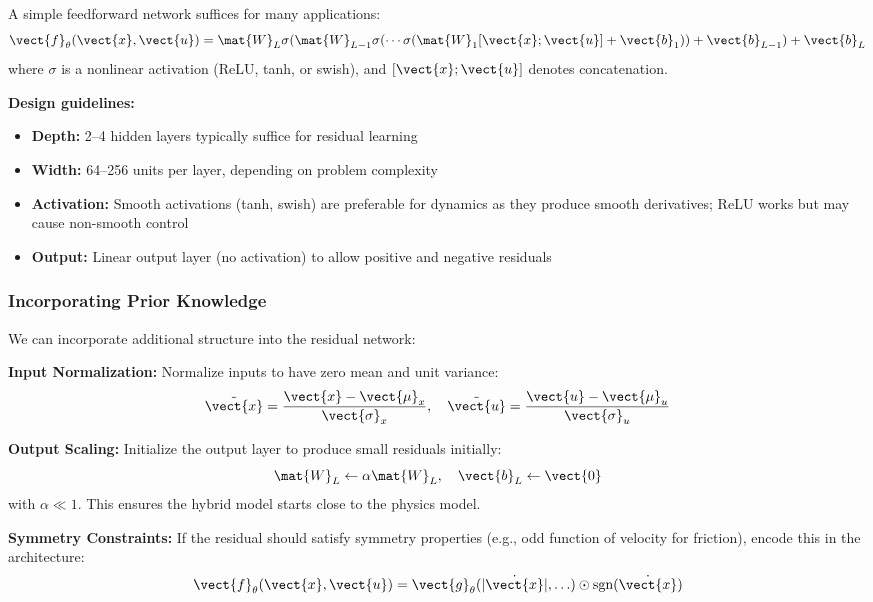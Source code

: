 A simple feedforward network suffices for many applications:
\begin{equation}
\vect{f}_\theta(\vect{x}, \vect{u}) = \mat{W}_L \sigma(\mat{W}_{L-1} \sigma(\cdots \sigma(\mat{W}_1 [\vect{x}; \vect{u}] + \vect{b}_1)) + \vect{b}_{L-1}) + \vect{b}_L
\label{eq:mlp_residual}
\end{equation}
where $\sigma$ is a nonlinear activation (ReLU, tanh, or swish), and $[\vect{x}; \vect{u}]$ denotes concatenation.

\textbf{Design guidelines:}
\begin{itemize}
    \item \textbf{Depth:} 2--4 hidden layers typically suffice for residual learning
    \item \textbf{Width:} 64--256 units per layer, depending on problem complexity
    \item \textbf{Activation:} Smooth activations (tanh, swish) are preferable for dynamics as they produce smooth derivatives; ReLU works but may cause non-smooth control
    \item \textbf{Output:} Linear output layer (no activation) to allow positive and negative residuals
\end{itemize}

\subsubsection{Incorporating Prior Knowledge}

We can incorporate additional structure into the residual network:

\textbf{Input Normalization:}
Normalize inputs to have zero mean and unit variance:
\begin{equation}
\tilde{\vect{x}} = \frac{\vect{x} - \vect{\mu}_x}{\vect{\sigma}_x}, \quad \tilde{\vect{u}} = \frac{\vect{u} - \vect{\mu}_u}{\vect{\sigma}_u}
\end{equation}

\textbf{Output Scaling:}
Initialize the output layer to produce small residuals initially:
\begin{equation}
\mat{W}_L \leftarrow \alpha \mat{W}_L, \quad \vect{b}_L \leftarrow \vect{0}
\end{equation}
with $\alpha \ll 1$. This ensures the hybrid model starts close to the physics model.

\textbf{Symmetry Constraints:}
If the residual should satisfy symmetry properties (e.g., odd function of velocity for friction), encode this in the architecture:
\begin{equation}
\vect{f}_\theta(\vect{x}, \vect{u}) = \vect{g}_\theta(|\dot{\vect{x}}|, \ldots) \odot \text{sgn}(\dot{\vect{x}})
\end{equation}

